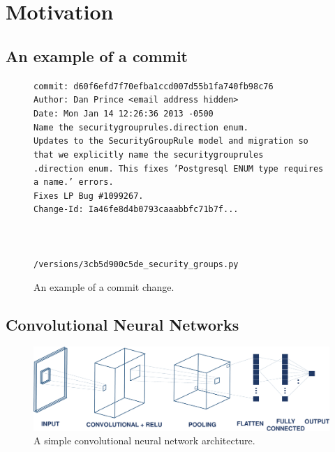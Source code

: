 
\section{Motivation}
\label{sec:motivation}



\subsection{An example of a commit }
\label{sec:examle}

\begin{figure}
\leftskip-0cm 
\texttt{commit: d60f6efd7f70efba1ccd007d55b1fa740fb98c76} \\ 
\texttt{Author: Dan Prince <email address hidden>} \\
\texttt{Date: Mon Jan 14 12:26:36 2013 -0500} \\
\hspace{2mm} \texttt{Name the securitygrouprules.direction enum.} \\
\hspace{2mm} \texttt{Updates to the SecurityGroupRule model and migration so that we explicitly name the securitygrouprules}\\\texttt{.direction enum. This fixes 'Postgresql ENUM type requires a name.' errors.} \\
\hspace{2mm} \texttt{Fixes LP Bug \#1099267.} \\
\hspace{2mm} \texttt{Change-Id: Ia46fe8d4b0793caaabbfc71b7f...} \\
\\
\\
\hspace{2mm} \\\texttt{/versions/3cb5d900c5de\_security\_groups.py} 
\caption{An example of a commit change.}
\end{figure}

\subsection{Convolutional Neural Networks}
\label{sec:background_cnn}

\begin{figure}[t!]
	\center
	\includegraphics[scale=0.3]{figs/cnn.pdf}
	\caption{A simple convolutional neural network architecture.}
	\label{fig:cnn}
\end{figure}


